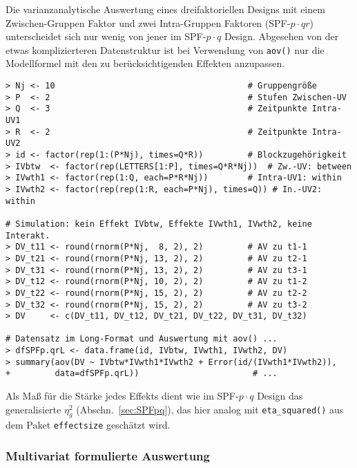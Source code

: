 Die varianzanalytische Auswertung eines dreifaktoriellen Designs mit einem Zwischen-Gruppen Faktor und zwei Intra-Gruppen Faktoren (SPF-$p \cdot qr$) unterscheidet sich nur wenig von jener im SPF-$p \cdot q$ Design. Abgesehen von der etwas komplizierteren Datenstruktur ist bei Verwendung von \lstinline!aov()! nur die Modellformel mit den zu berücksichtigenden Effekten anzupassen.
\begin{lstlisting}
> Nj <- 10                                       # Gruppengröße
> P  <- 2                                        # Stufen Zwischen-UV
> Q  <- 3                                        # Zeitpunkte Intra-UV1
> R  <- 2                                        # Zeitpunkte Intra-UV2
> id <- factor(rep(1:(P*Nj), times=Q*R))         # Blockzugehörigkeit
> IVbtw  <- factor(rep(LETTERS[1:P], times=Q*R*Nj))  # Zw.-UV: between
> IVwth1 <- factor(rep(1:Q, each=P*R*Nj))        # Intra-UV1: within
> IVwth2 <- factor(rep(rep(1:R, each=P*Nj), times=Q)) # In.-UV2: within

# Simulation: kein Effekt IVbtw, Effekte IVwth1, IVwth2, keine Interakt.
> DV_t11 <- round(rnorm(P*Nj,  8, 2), 2)         # AV zu t1-1
> DV_t21 <- round(rnorm(P*Nj, 13, 2), 2)         # AV zu t2-1
> DV_t31 <- round(rnorm(P*Nj, 13, 2), 2)         # AV zu t3-1
> DV_t12 <- round(rnorm(P*Nj, 10, 2), 2)         # AV zu t1-2
> DV_t22 <- round(rnorm(P*Nj, 15, 2), 2)         # AV zu t2-2
> DV_t32 <- round(rnorm(P*Nj, 15, 2), 2)         # AV zu t3-2
> DV     <- c(DV_t11, DV_t12, DV_t21, DV_t22, DV_t31, DV_t32)

# Datensatz im Long-Format und Auswertung mit aov() ...
> dfSPFp.qrL <- data.frame(id, IVbtw, IVwth1, IVwth2, DV)
> summary(aov(DV ~ IVbtw*IVwth1*IVwth2 + Error(id/(IVwth1*IVwth2)),
+         data=dfSPFp.qrL))                       # ...
\end{lstlisting}

Als Maß für die Stärke jedes Effekts dient wie im SPF-$p \cdot q$ Design das generalisierte $\eta_{g}^{2}$ (Abschn.\ \ref{sec:SPFpq}), das hier analog mit \lstinline!eta_squared()! aus dem Paket \lstinline!effectsize! geschätzt wird.

\subsubsection{Multivariat formulierte Auswertung}

